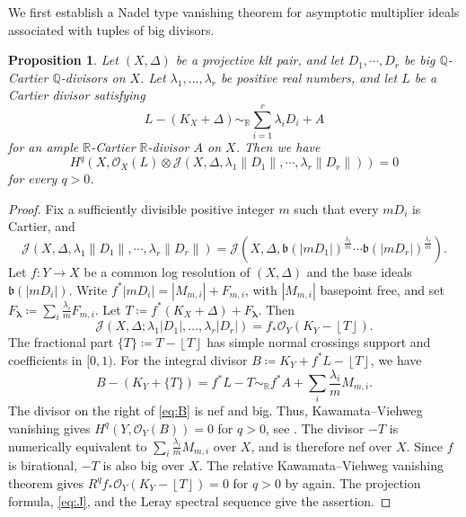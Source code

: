 \documentclass[a4paper,12pt]{amsart}
\newtheorem{proposition}[theorem]{Proposition}
\theoremstyle{plain}
\theoremstyle{definition}
\numberwithin{equation}{section}
\newcommand{\R}{\mathbb{R}}
\newcommand{\Q}{\mathbb{Q}}
\newcommand{\OO}{\mathcal{O}}
\newcommand{\floor}[1]{\left\lfloor #1 \right\rfloor}
\begin{document}
We first establish a Nadel type vanishing theorem for asymptotic multiplier ideals associated with tuples of big divisors.

\begin{proposition}\label{prop;Nadel type}
Let $(X,\Delta)$ be a projective klt pair, and let $D_1,\cdots,D_r$ be big $\Q$-Cartier $\Q$-divisors on $X$. Let $\lambda_1,\dots,\lambda_r$ be positive real numbers, and let $L$ be a Cartier divisor satisfying
$$L-(K_X+\Delta)\sim_{\R}\sum_{i=1}^r \lambda_iD_i+A$$
for an ample $\R$-Cartier $\R$-divisor $A$ on $X$. Then we have
$$ H^q(X,\mathcal{O}_X(L)\otimes \mathcal{J}(X,\Delta,\lambda_1\|D_1\|,\cdots,\lambda_r\|D_r\|))=0$$
for every \(q>0\).
\end{proposition}

\begin{proof}
Fix a sufficiently divisible positive integer $m$ such that every $mD_i$ is Cartier, and
$$ \mathcal{J}(X,\Delta,\lambda_1\|D_1\|,\cdots,\lambda_r \|D_r\|)=\mathcal{J}\left(X,\Delta,\mathfrak{b}\left(|mD_1|\right)^{\frac{\lambda_1}{m}}\cdots \mathfrak{b}(|mD_r|)^{\frac{\lambda_r}{m}}\right).$$
Let $f\colon Y\to X$ be a common log resolution of $(X,\Delta)$ and the base ideals $\mathfrak{b}(|mD_i|)$. Write $f^*|mD_i|=|M_{m,i}|+F_{m,i}$, with $|M_{m,i}|$ basepoint free, and set $F_{\mathbf{\lambda}}\coloneqq \sum_i \frac{\lambda_i}{m}F_{m,i}$. Let $T\coloneqq f^{\ast}(K_X+\Delta)+F_{\mathbf{\lambda}}$. Then 
\begin{equation}\label{eq:J}
    \mathcal{J}(X,\Delta;\lambda_1|D_1|,\dots,\lambda_r|D_r|)=f_{\ast}\OO_Y(K_Y-\floor{T}).
\end{equation}
The fractional part $\{T\}\coloneqq T-\floor{T}$ has simple normal crossings support and coefficients in $[0,1)$. For the integral divisor $B\coloneqq K_Y+f^{\ast}L-\floor{T}$, we have
\begin{equation}\label{eq:B}
    B-(K_Y+\{T\})=f^{\ast}L-T\sim_{\R} f^{\ast}A+\sum_i\frac{\lambda_i}{m}M_{m,i}.
\end{equation}
The divisor on the right of \eqref{eq:B} is nef and big. Thus, Kawamata--Viehweg vanishing gives $H^q(Y,\OO_Y(B))=0$ for $q>0$, see \cite[Theorem 3.2.9]{Fuj17}. The divisor $-T$ is numerically equivalent to $\sum_i \frac{\lambda_i}{m}M_{m,i}$ over $X$, and is therefore nef over $X$. Since $f$ is birational, $-T$ is also big over $X$. The relative Kawamata--Viehweg vanishing theorem gives $R^qf_{\ast}\OO_Y(K_Y-\floor{T})=0$ for $q>0$ by \cite[Theorem 3.2.9]{Fuj17} again. The projection formula, \eqref{eq:J}, and the Leray spectral sequence give the assertion.
\end{proof}
\end{document}
